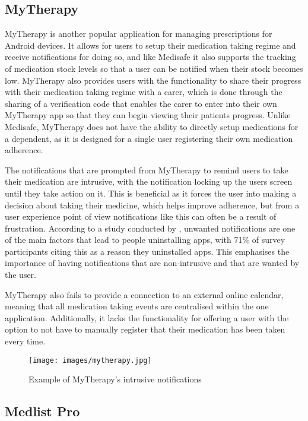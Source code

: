 \documentclass{l4proj}
\begin{document}
\subsection{MyTherapy}

MyTherapy is another popular application for managing prescriptions for Android devices. It allows for users to setup their medication taking regime and receive notifications for doing so, and like Medisafe it also supports the tracking of medication stock levels so that a user can be notified when their stock becomes low. MyTherapy also provides users with the functionality to share their progress with their medication taking regime with a carer, which is done through the sharing of a verification code that enables the carer to enter into their own MyTherapy app so that they can begin viewing their patients progress. Unlike Medisafe, MyTherapy does not have the ability to directly setup medications for a dependent, as it is designed for a single user registering their own medication adherence. 

The notifications that are prompted from MyTherapy to remind users to take their medication are intrusive, with the notification locking up the users screen until they take action on it. This is beneficial as it forces the user into making a decision about taking their medicine, which helps improve adherence, but from a user experience point of view notifications like this can often be a result of frustration. According to a study conducted by \cite{vanneldas_2020}, unwanted notifications are one of the main factors that lead to people uninstalling apps, with 71\% of survey participants citing this as a reason they uninstalled apps. This emphasises the importance of having notifications that are non-intrusive and that are wanted by the user.

MyTherapy also fails to provide a connection to an external online calendar, meaning that all medication taking events are centralised within the one application. Additionally, it lacks the functionality for offering a user with the option to not have to manually register that their medication has been taken every time.

\begin{figure}[!ht]
    \centering
    \texttt{[image: images/mytherapy.jpg]}
    \caption{Example of MyTherapy's intrusive notifications}
    \label{fig:mytherapy_notif}
\end{figure}

\subsection{Medlist Pro}
\end{document}
